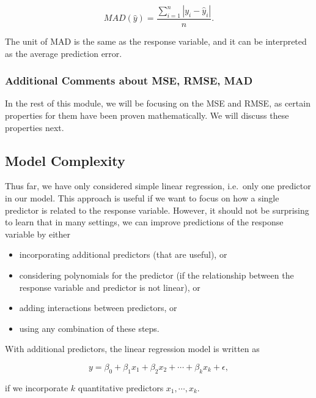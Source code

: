 \documentclass[
]{book}
\providecommand{\tightlist}{%
  \setlength{\itemsep}{0pt}\setlength{\parskip}{0pt}}
\begin{document}
\begin{equation} 
MAD(\hat{y}) = \frac{\sum_{i=1}^n |y_i - \hat{y}_i|}{n}.
\label{eq:10-MAD}
\end{equation}

The unit of MAD is the same as the response variable, and it can be interpreted as the average prediction error.

\hypertarget{additional-comments-about-mse-rmse-mad}{%
\subsubsection{Additional Comments about MSE, RMSE, MAD}\label{additional-comments-about-mse-rmse-mad}}

In the rest of this module, we will be focusing on the MSE and RMSE, as certain properties for them have been proven mathematically. We will discuss these properties next.

\hypertarget{model-complexity}{%
\subsection{Model Complexity}\label{model-complexity}}

Thus far, we have only considered simple linear regression, i.e.~only one predictor in our model. This approach is useful if we want to focus on how a single predictor is related to the response variable. However, it should not be surprising to learn that in many settings, we can improve predictions of the response variable by either

\begin{itemize}
\tightlist
\item
  incorporating additional predictors (that are useful), or
\item
  considering polynomials for the predictor (if the relationship between the response variable and predictor is not linear), or
\item
  adding interactions between predictors, or
\item
  using any combination of these steps.
\end{itemize}

With additional predictors, the linear regression model is written as

\begin{equation} 
y=\beta_0+\beta_{1}x_1 + \beta_2 x_2 + \cdots + \beta_k x_k + \epsilon,
\label{eq:10-MLRmod}
\end{equation}

if we incorporate \(k\) quantitative predictors \(x_1, \cdots, x_k\).
\end{document}
